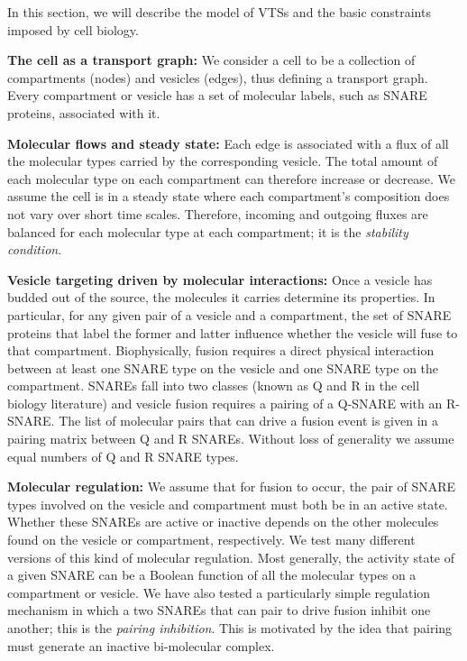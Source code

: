 
In this section, we will describe the model of VTSs and the basic constraints imposed by cell biology.

\textbf{The cell as a transport graph:} We consider a cell to be a collection of compartments (nodes) and vesicles (edges), thus defining a transport graph. Every compartment or vesicle has a set of molecular labels, such as SNARE proteins, associated with it.

\textbf{Molecular flows and steady state:} Each edge is associated with a flux of all the molecular types carried by the corresponding vesicle. The total amount of each molecular type on each compartment can therefore increase or decrease. We assume the cell is in a steady state where each compartment’s composition does not vary over short time scales. Therefore, incoming and outgoing fluxes are balanced for each molecular type at each compartment; it is the \textit{stability condition}.

\textbf{Vesicle targeting driven by molecular interactions:} Once a vesicle has budded out of the source, the molecules it carries determine its properties. In particular, for any given pair of a vesicle and a compartment, the set of SNARE proteins that label the former and latter influence whether the vesicle will fuse to that compartment. Biophysically, fusion requires a direct physical interaction between at least one SNARE type on the vesicle and one SNARE type on the compartment. SNAREs fall into two classes (known as Q and R in the cell biology literature) and vesicle fusion requires a pairing of a Q-SNARE with an R-SNARE. The list of molecular pairs that can drive a fusion event is given in a pairing matrix between Q and R SNAREs. Without loss of generality we assume equal numbers of Q and R SNARE types.

\textbf{Molecular regulation:} We assume that for fusion to occur, the pair of SNARE types involved on the vesicle and compartment must both be in an active state. Whether these SNAREs are active or inactive depends on the other molecules found on the vesicle or compartment, respectively. We test many different versions of this kind of molecular regulation. Most generally, the activity state of a given SNARE can be a Boolean function of all the molecular types on a compartment or vesicle. We have also tested \cite{shukla} a particularly simple regulation mechanism in which a two SNAREs that can pair to drive fusion inhibit one another; this is the \textit{pairing inhibition}. This is motivated by the idea that pairing must generate an inactive bi-molecular complex.

